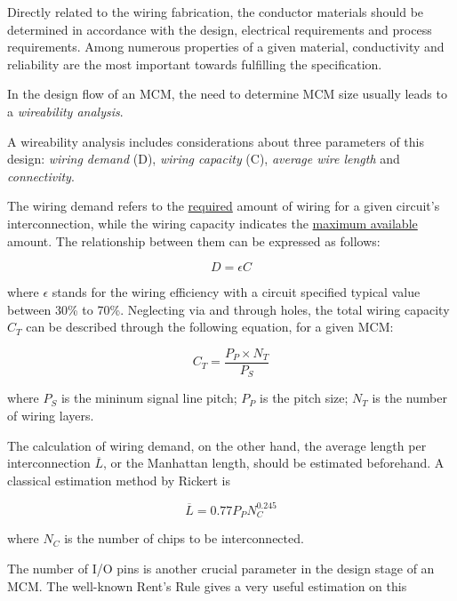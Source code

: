 \begin{spacing}{1.5}
Directly related to the wiring fabrication, the conductor materials should be determined in accordance with the design, electrical requirements and process requirements. Among numerous properties of a given material, conductivity and reliability are the most important towards fulfilling the specification. \cite{chen2006vlsi}

In the design flow of an MCM, the need to determine MCM size usually leads to a \textit{wireability analysis}. 

A wireability analysis includes considerations about three parameters of this design: \textit{wiring demand} (D), \textit{wiring capacity} (C), \textit{average wire length} and \textit{connectivity}. 

The wiring demand refers to the \underline{required} amount of wiring for a given circuit's interconnection, while the wiring capacity indicates the \underline{maximum available} amount. The relationship between them can be expressed as follows: 

\begin{equation}
    \label{eq.demand} 
    D=\epsilon C
\end{equation}

where $\epsilon$ stands for the wiring efficiency with a circuit specified typical value between 30\% to 70\%. Neglecting via and through holes, the total wiring capacity $C_T$ can be described through the following equation, for a given MCM: 

\begin{equation}
    \label{eq.capacity}
    C_T=\frac{P_P\times N_T}{P_S}
\end{equation}

where $P_S$ is the mininum signal line pitch; $P_P$ is the pitch size; $N_T$ is the number of wiring layers. 

The calculation of wiring demand, on the other hand, the average length per interconnection $\overline{L}$, or the Manhattan length, should be estimated beforehand. A classical estimation method by Rickert is 

\begin{equation}
    \label{eq.rickert}
    \overline{L}=0.77P_PN_C^{0.245}
\end{equation}

where $N_C$ is the number of chips to be interconnected. \cite{rickert1989design} 

The number of I/O pins is another crucial parameter in the design stage of an MCM. The well-known Rent's Rule gives a very useful estimation on this 


\end{spacing}

